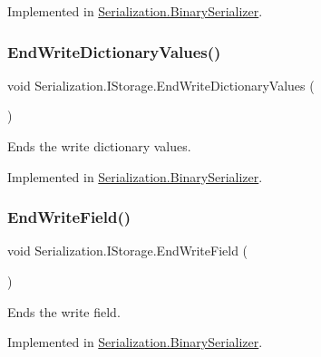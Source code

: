 Implemented in \hyperlink{class_serialization_1_1_binary_serializer_ad8d7709505dfa6e3e973223411397fa0}{Serialization.\+Binary\+Serializer}.

\mbox{\label{interface_serialization_1_1_i_storage_ad1d8b55f3ae8fa16cf2dc58103263999}} 
\subsubsection{\texorpdfstring{End\+Write\+Dictionary\+Values()}{EndWriteDictionaryValues()}}
{\footnotesize\ttfamily void Serialization.\+I\+Storage.\+End\+Write\+Dictionary\+Values (\begin{DoxyParamCaption}{ }\end{DoxyParamCaption})}



Ends the write dictionary values. 



Implemented in \hyperlink{class_serialization_1_1_binary_serializer_a73fd29b68829c4662864e9f922800c1f}{Serialization.\+Binary\+Serializer}.

\mbox{\label{interface_serialization_1_1_i_storage_a0e0c8f96ea2316bc9efc73cd27176897}} 
\subsubsection{\texorpdfstring{End\+Write\+Field()}{EndWriteField()}}
{\footnotesize\ttfamily void Serialization.\+I\+Storage.\+End\+Write\+Field (\begin{DoxyParamCaption}{ }\end{DoxyParamCaption})}



Ends the write field. 



Implemented in \hyperlink{class_serialization_1_1_binary_serializer_a3fa0ec1f937e4009887ea69b42461c04}{Serialization.\+Binary\+Serializer}.

